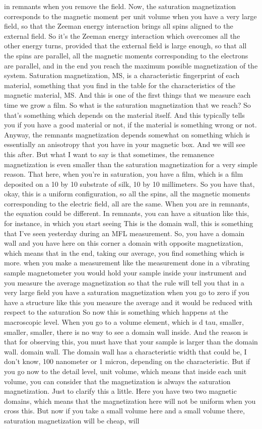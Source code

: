 in remnants when you remove the field. Now, the saturation magnetization corresponds to the magnetic moment per unit volume when you have a very large field, so that the Zeeman energy interaction brings all spins aligned to the external field. So it's the Zeeman energy interaction which overcomes all the other energy turns, provided that the external field is large enough, so that all the spins are parallel, all the magnetic moments corresponding to the electrons are parallel, and in the end you reach the maximum possible magnetization of the system. Saturation magnetization, MS, is a characteristic fingerprint of each material, something that you find in the table for the characteristics of the magnetic material, MS. And this is one of the first things that we measure each time we grow a film. So what is the saturation magnetization that we reach? So that's something which depends on the material itself. And this typically tells you if you have a good material or not, if the material is something wrong or not. Anyway, the remnants magnetization depends somewhat on something which is essentially an anisotropy that you have in your magnetic box. And we will see this after. But what I want to say is that sometimes, the remanence magnetization is even smaller than the saturation magnetization for a very simple reason. That here, when you're in saturation, you have a film, which is a film deposited on a 10 by 10 substrate of silk, 10 by 10 millimeters. So you have that, okay, this is a uniform configuration, so all the spins, all the magnetic moments corresponding to the electric field, all are the same. When you are in remnants, the equation could be different. In remnants, you can have a situation like this, for instance, in which you start seeing This is the domain wall, this is something that I've seen yesterday during an MFL measurement. So, you have a domain wall and you have here on this corner a domain with opposite magnetization, which means that in the end, taking our average, you find something which is more. when you make a measurement like the measurement done in a vibrating sample magnetometer you would hold your sample inside your instrument and you measure the average magnetization so that the rule will tell you that in a very large field you have a saturation magnetization when you go to zero if you have a structure like this you measure the average and it would be reduced with respect to the saturation So now this is something which happens at the macroscopic level. When you go to a volume element, which is d tau, smaller, smaller, smaller, there is no way to see a domain wall inside. And the reason is that for observing this, you must have that your sample is larger than the domain wall. domain wall. The domain wall has a characteristic width that could be, I don't know, 100 nanometer or 1 micron, depending on the characteristic. But if you go now to the detail level, unit volume, which means that inside each unit volume, you can consider that the magnetization is always the saturation magnetization. Just to clarify this a little. Here you have two two magnetic domains, which means that the magnetization here will not be uniform when you cross this. But now if you take a small volume here and a small volume there, saturation magnetization will be cheap, will 